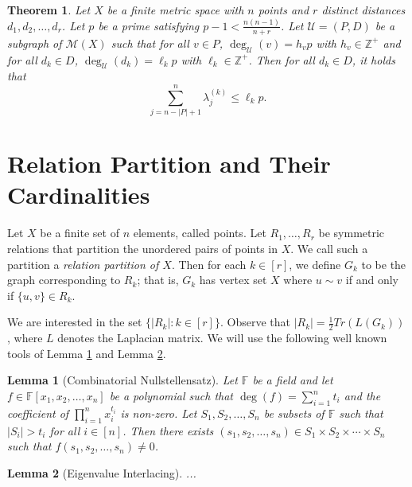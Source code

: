 \documentclass[12pt]{article}
\newcommand{\Z}{\mathbb{Z}}
\newtheorem{thm}{Theorem}[section] %
\newtheorem{lem}{Lemma} %
\theoremstyle{definition}
\begin{document}
	\begin{thm}
		Let $X$ be a finite metric space with $n$ points and $r$ distinct distances $d_1, d_2, \ldots, d_r$.  Let $p$ be a prime satisfying $p-1 < \tfrac{n(n-1)}{n+r}$.  Let $\mathcal{U} = (P,D)$ be a subgraph of $\mathcal{M}(X)$ such that for all $v \in P$, $\deg_{\mathcal{U}}(v) = h_vp$ with $h_v \in \Z^+$ and for all $d_k \in D$, $\deg_{\mathcal{U}}(d_k) = \ell_k p $ with $\ell_k \in \Z^+$.  Then for all $d_k \in D$, it holds that
		$$\sum_{j=n-|P|+1}^n \lambda_j^{(k)} \leq \ell_k p.$$
	\end{thm}
	\newpage
	\section{Relation Partition and Their Cardinalities}
	Let $X$ be a finite set of $n$ elements, called points.  Let $R_1, \ldots, R_r$ be symmetric relations that partition the unordered pairs of points in $X$.  We call such a partition a \emph{relation partition of $X$}.  Then for each $k \in [r]$, we define $G_k$ to be the graph corresponding to $R_k$; that is, $G_k$ has vertex set $X$ where $u\sim v$ if and only if $\{u,v\} \in R_k$.  
	
	We are interested in the set $\{|R_k|: k \in [r]\}$.  Observe that $|R_k| = \tfrac{1}{2}Tr(L(G_k))$, where $L$ denotes the Laplacian matrix.  We will use the following well known tools of Lemma \ref{Lem-CombinatorialNullstellensatz} and Lemma \ref{Lem-EigenvalueInterlacing}.
	
	\begin{lem}[Combinatorial Nullstellensatz]\label{Lem-CombinatorialNullstellensatz}
		Let $\mathbb{F}$ be a field and let $f \in \mathbb{F}[x_1,x_2,\ldots,x_n]$ be a polynomial such that $\deg(f) = \sum_{i=1}^n t_i$ and the coefficient of $\prod_{i=1}^n x_i^{t_i}$ is non-zero.  Let $S_1,S_2,\ldots,S_n$ be subsets of $\mathbb{F}$ such that $|S_i| > t_i$ for all $i \in [n]$.  Then there exists $(s_1,s_2,\ldots,s_n) \in S_1 \times S_2 \times \cdots \times S_n$ such that $f(s_1,s_2,\ldots,s_n) \neq 0$.
	\end{lem}

	\begin{lem}[Eigenvalue Interlacing]\label{Lem-EigenvalueInterlacing}
		...
	\end{lem}
	
\end{document}
